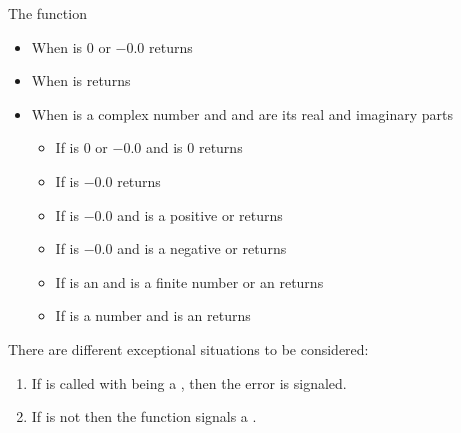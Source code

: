 \documentclass[../Comparisons-Predicates.tex]{subfiles}
\begin{document}
\noindent
The function 
\begin{itemize}
\item When  is $0$ or $-0.0$ returns
\item When  is  returns
\item When  is a complex number and  and
   are its real and imaginary parts
  \begin{itemize}
  \item If  is $0$ or $-0.0$ and
     is $0$ returns\\
     \code{)))}
  \item If  is $-0.0$ returns\\
     
  \item If  is $-0.0$ and  is a
    positive  or  returns\\
     
  \item If  is $-0.0$ and  is a
    negative  or  returns\\
     
  \item If  is an  and 
    is a finite number or an  returns\\
    \code{)))}
  \item If  is a  number and 
    is an  returns
     \code{)))}
  \end{itemize}
\end{itemize}


\DExceptional{}

There are different exceptional situations to be considered:
\begin{enumerate}
\item If  is called with
   being a , then the
   error is signaled.
\item If  is not \CL{}
   then the function  signals a
  .
\end{enumerate}
\end{document}
